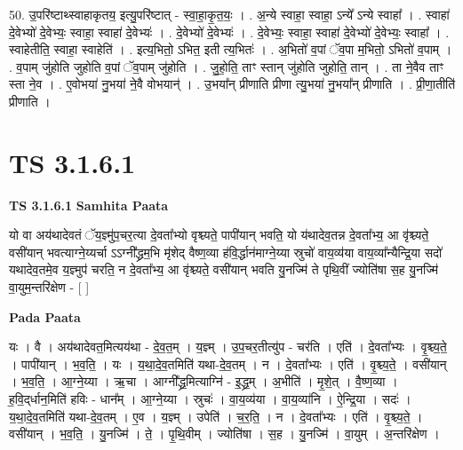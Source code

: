 \documentclass[17pt]{extarticle}
\begin{document}
50. उ॒परि॑ष्टाथ्स्वाहाकृतय॒ इत्यु॒परि॑ष्टात् - स्वा॒हा॒कृ॒त॒यः॒ । . अ॒न्ये स्वाहा॒ स्वाहा॒ ऽन्ये᳚ ऽन्ये स्वाहा᳚ । . स्वाहा॑ दे॒वेभ्यो॑ दे॒वेभ्यः॒ स्वाहा॒ स्वाहा॑ दे॒वेभ्यः॑ । . दे॒वेभ्यो॑ दे॒वेभ्यः॑ । . दे॒वेभ्यः॒ स्वाहा॒ स्वाहा॑ दे॒वेभ्यो॑ दे॒वेभ्यः॒ स्वाहा᳚ । . स्वाहेतीति॒ स्वाहा॒ स्वाहेति॑ । . इत्य॒भितो॒ ऽभित॒ इती त्य॒भितः॑ । . अ॒भितो॑ व॒पां ॅव॒पा म॒भितो॒ ऽभितो॑ व॒पाम् । . व॒पाम् जु॑होति जुहोति व॒पां ॅव॒पाम् जु॑होति । . जु॒हो॒ति॒ ताꣳ स्तान् जु॑होति जुहोति॒ तान् । . ता ने॒वैव ताꣳ स्ता ने॒व । . ए॒वोभया॑ नु॒भया॑ ने॒वै वोभयान्॑ । . उ॒भया᳚न् प्रीणाति प्रीणा त्यु॒भया॑ नु॒भया᳚न् प्रीणाति । . प्री॒णा॒तीति॑ प्रीणाति । \newline
\pagebreak
{}

\section{ TS 3.1.6.1 }

\textbf{TS 3.1.6.1 } \newline
\textbf{Samhita Paata} \newline

यो वा अय॑थादेवतं ॅय॒ज्ञ्मु॑प॒चर॒त्या दे॒वता᳚भ्यो वृश्च्यते॒ पापी॑यान् भवति॒ यो य॑थादेव॒तन्न दे॒वता᳚भ्य॒ आ वृ॑श्च्यते॒ वसी॑यान् भवत्याग्ने॒य्यर्चा ऽऽग्नी᳚द्ध्रम॒भि मृ॑शेद् वैष्ण॒व्या ह॑वि॒र्द्धान॑माग्ने॒य्या स्रुचो॑ वाय॒व्य॑या वाय॒व्या᳚न्यैन्द्रि॒या सदो॑ यथादेव॒तमे॒व य॒ज्ञ्मुप॑ चरति॒ न दे॒वता᳚भ्य॒ आ वृ॑श्च्यते॒ वसी॑यान् भवति यु॒नज्मि॑ ते पृथि॒वीं ज्योति॑षा स॒ह यु॒नज्मि॑ वा॒युम॒न्तरि॑क्षेण - [  ] \newline

\textbf{Pada Paata} \newline

यः । वै । अय॑थादेवत॒मित्यय॑था - दे॒व॒त॒म् । य॒ज्ञ्म् । उ॒प॒चर॒तीत्यु॑प - चर॑ति । एति॑ । दे॒वता᳚भ्यः । वृ॒श्च्य॒ते॒ । पापी॑यान् । भ॒व॒ति॒ । यः । य॒था॒दे॒व॒तमिति॑ यथा-दे॒व॒तम् । न । दे॒वता᳚भ्यः । एति॑ । वृ॒श्च्य॒ते॒ । वसी॑यान् । भ॒व॒ति॒ । आ॒ग्ने॒य्या । ऋ॒चा । आग्नी᳚द्ध्र॒मित्याग्नि॑ - इ॒द्ध्र॒म् । अ॒भीति॑ । मृ॒शे॒त् । वै॒ष्ण॒व्या । ह॒वि॒द्‌र्धान॒मिति॑ हविः - धान᳚म् । आ॒ग्ने॒य्या । स्रुचः॑ । वा॒य॒व्य॑या । वा॒य॒व्या॑नि । ऐ॒न्द्रि॒या । सदः॑ । य॒था॒दे॒व॒तमिति॑ यथा-दे॒व॒तम् । ए॒व । य॒ज्ञ्म् । उपेति॑ । च॒र॒ति॒ । न । दे॒वता᳚भ्यः । एति॑ । वृ॒श्च्य॒ते॒ । वसी॑यान् । भ॒व॒ति॒ । यु॒नज्मि॑ । ते॒ । पृ॒थि॒वीम् । ज्योति॑षा । स॒ह । यु॒नज्मि॑ । वा॒युम् । अ॒न्तरि॑क्षेण ।  \newline
\end{document}
